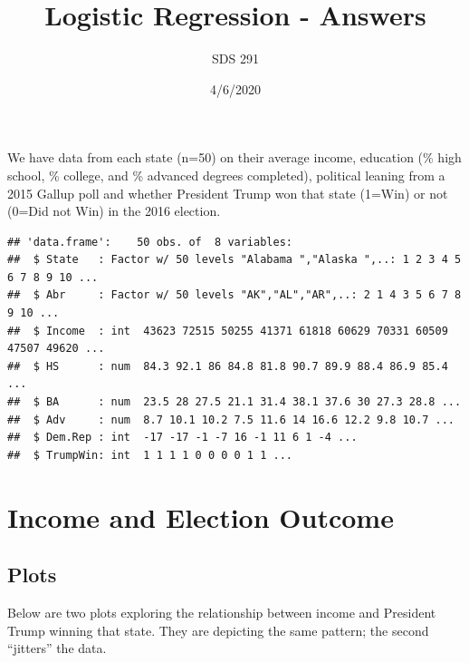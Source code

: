\documentclass[]{article}
\title{Logistic Regression - Answers}
\author{SDS 291}
\date{4/6/2020}
\begin{document}
\maketitle

{
\setcounter{tocdepth}{2}
\tableofcontents
}
We have data from each state (n=50) on their average income, education
(\% high school, \% college, and \% advanced degrees completed),
political leaning from a 2015 Gallup poll and whether President Trump
won that state (1=Win) or not (0=Did not Win) in the 2016 election.

\begin{verbatim}
## 'data.frame':    50 obs. of  8 variables:
##  $ State   : Factor w/ 50 levels "Alabama ","Alaska ",..: 1 2 3 4 5 6 7 8 9 10 ...
##  $ Abr     : Factor w/ 50 levels "AK","AL","AR",..: 2 1 4 3 5 6 7 8 9 10 ...
##  $ Income  : int  43623 72515 50255 41371 61818 60629 70331 60509 47507 49620 ...
##  $ HS      : num  84.3 92.1 86 84.8 81.8 90.7 89.9 88.4 86.9 85.4 ...
##  $ BA      : num  23.5 28 27.5 21.1 31.4 38.1 37.6 30 27.3 28.8 ...
##  $ Adv     : num  8.7 10.1 10.2 7.5 11.6 14 16.6 12.2 9.8 10.7 ...
##  $ Dem.Rep : int  -17 -17 -1 -7 16 -1 11 6 1 -4 ...
##  $ TrumpWin: int  1 1 1 1 0 0 0 0 1 1 ...
\end{verbatim}

\hypertarget{income-and-election-outcome}{%
\section{Income and Election
Outcome}\label{income-and-election-outcome}}

\hypertarget{plots}{%
\subsection{Plots}\label{plots}}

Below are two plots exploring the relationship between income and
President Trump winning that state. They are depicting the same pattern;
the second ``jitters'' the data.
\end{document}
